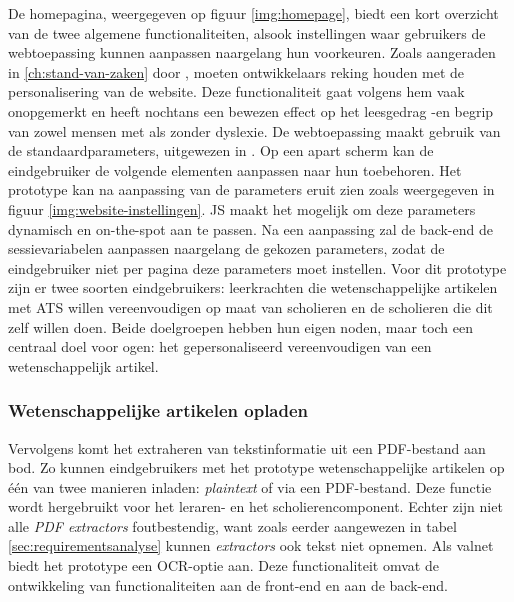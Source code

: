 De homepagina, weergegeven op figuur \ref{img:homepage}, biedt een kort overzicht van de twee algemene functionaliteiten, alsook instellingen waar gebruikers de webtoepassing kunnen aanpassen naargelang hun voorkeuren. Zoals aangeraden in \ref{ch:stand-van-zaken} door \textcite{Harvard2023}, moeten ontwikkelaars reking houden met de personalisering van de website. Deze functionaliteit gaat volgens hem vaak onopgemerkt en heeft nochtans een bewezen effect op het leesgedrag -en begrip van zowel mensen met als zonder dyslexie. De webtoepassing maakt gebruik van de standaardparameters, uitgewezen in \textcite{Rello2013a, Rello2013b}. Op een apart scherm kan de eindgebruiker de volgende elementen aanpassen naar hun toebehoren. Het prototype kan na aanpassing van de parameters eruit zien zoals weergegeven in figuur \ref{img:website-instellingen}. JS maakt het mogelijk om deze parameters dynamisch en on-the-spot aan te passen. Na een aanpassing zal de back-end de sessievariabelen aanpassen naargelang de gekozen parameters, zodat de eindgebruiker niet per pagina deze parameters moet instellen. Voor dit prototype zijn er twee soorten eindgebruikers: leerkrachten die wetenschappelijke artikelen met ATS willen vereenvoudigen op maat van scholieren en de scholieren die dit zelf willen doen. Beide doelgroepen hebben hun eigen noden, maar toch een centraal doel voor ogen: het gepersonaliseerd vereenvoudigen van een wetenschappelijk artikel.

\subsubsection{Wetenschappelijke artikelen opladen}

Vervolgens komt het extraheren van tekstinformatie uit een PDF-bestand aan bod. Zo kunnen eindgebruikers met het prototype wetenschappelijke artikelen op één van twee manieren inladen: \textit{plaintext} of via een PDF-bestand.  Deze functie wordt hergebruikt voor het leraren- en het scholierencomponent. Echter zijn niet alle \textit{PDF extractors} foutbestendig, want zoals eerder aangewezen in tabel \ref{sec:requirementsanalyse} kunnen \textit{extractors} ook tekst niet opnemen. Als valnet biedt het prototype een OCR-optie aan. Deze functionaliteit omvat de ontwikkeling van functionaliteiten aan de front-end en aan de back-end.

\medspace

